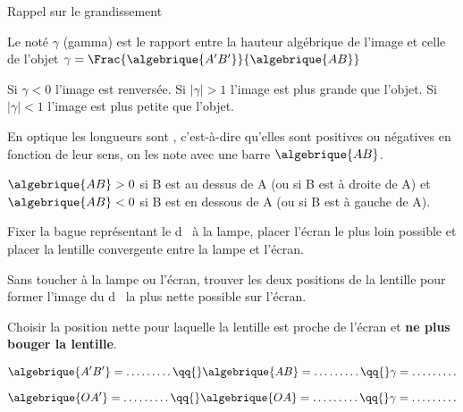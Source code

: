 \begin{doc}{Rappel sur le grandissement}
  \label{doc:grandissement}
  \vspace*{-24pt}
  \begin{encart}
    Le  noté $\gamma$ (gamma) est le rapport entre la hauteur algébrique de l'image et celle de l'objet
    $\gamma = \Frac{\algebrique{A'B'}}{\algebrique{AB}}$
  \end{encart}
  Si $\gamma < 0$ l'image est renversée.
  Si $|\gamma| > 1$ l'image est plus grande que l'objet. 
  Si $|\gamma| < 1$ l'image est plus petite que l'objet.
  
  \begin{encart}
    En optique les longueurs sont , c'est-à-dire qu'elles sont positives ou négatives en fonction de leur sens, on les note avec une barre $\algebrique{AB}$.
  \end{encart}
  \exemple $\algebrique{AB} > 0$ si B est au dessus de A (ou si B est à droite de A) et $\algebrique{AB} < 0$ si B est en dessous de A (ou si B est à gauche de A).
\end{doc}
\bigskip


\mesure
Fixer la bague représentant le \og d \fg\, à la lampe, placer l’écran le plus loin possible et placer la lentille convergente entre la lampe et l’écran.

Sans toucher à la lampe ou l'écran, trouver les deux positions de la lentille pour former l’image du \og d \fg\, la plus nette possible sur l’écran.
  
Choisir la position nette pour laquelle la lentille est proche de l’écran et \textbf{ne plus bouger la lentille}.

\vspace*{-8pt}
\begin{equation*}
  \algebrique{A'B'} = \ldots \ldots \ldots
  \qq{}
  \algebrique{AB} = \ldots \ldots \ldots
  \qq{}
  \gamma = \ldots \ldots \ldots
\end{equation*}


\vspace*{-8pt}
\begin{equation*}
  \algebrique{OA'} = \ldots \ldots \ldots
  \qq{}
  \algebrique{OA} = \ldots \ldots \ldots
  \qq{}
  \gamma = \ldots \ldots \ldots
\end{equation*}

